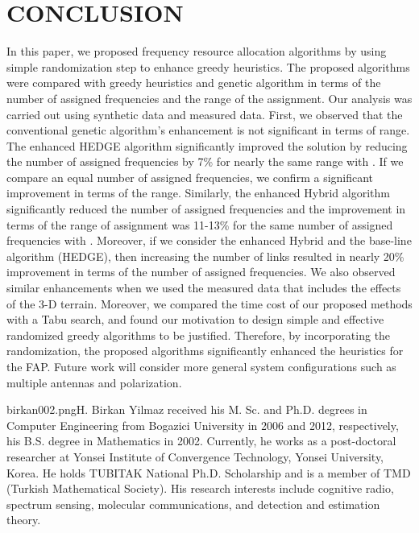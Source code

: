 \documentclass[10pt,twocolumn,twoside]{JCNtran}
\newcommand{\tbirkan}[1]{#1}
\begin{document}
\vspace{10pt}
\section{\uppercase{Conclusion}}
\label{sec:concl}
In this paper, we proposed frequency resource allocation algorithms by using \tbirkan{simple} randomization \tbirkan{step} to enhance greedy heuristics. The proposed algorithms were compared with greedy heuristics and genetic algorithm in terms of the number of assigned frequencies and the range of the assignment. Our analysis was carried out using synthetic data and measured data. First, we observed that the conventional genetic algorithm's enhancement is not significant in terms of range. The enhanced HEDGE algorithm significantly improved the solution by reducing the number of assigned frequencies by 7\% for nearly the same range with . If we compare an equal number of assigned frequencies, we confirm a significant improvement in terms of the range. Similarly, the enhanced Hybrid algorithm significantly reduced the number of assigned frequencies and the improvement in terms of the range of assignment was 11-13\% for the same number of assigned frequencies with . Moreover, if we consider the enhanced Hybrid and the base-line algorithm (HEDGE), then increasing the number of links resulted in nearly 20\% improvement in terms of the number of assigned frequencies. We also observed similar enhancements when we used the measured data that includes the effects of the 3-D terrain. \tbirkan{Moreover, we compared the time cost of our proposed methods with a Tabu search, and found our motivation to design simple and effective randomized greedy algorithms to be justified.} Therefore, by incorporating the randomization, the proposed algorithms significantly enhanced the heuristics for the FAP. Future work will consider more general system configurations such as multiple antennas and polarization. 








\epsfysize=3.2cm
\begin{biography}{birkan002.png}{H. Birkan Yilmaz}
received his M. Sc. and Ph.D. degrees in Computer Engineering from Bogazici University in 2006 and 2012, respectively, his B.S. degree in Mathematics in 2002. Currently, he works as a post-doctoral researcher at Yonsei Institute of Convergence Technology, Yonsei University, Korea. He holds TUBITAK National Ph.D. Scholarship and is a member of TMD (Turkish Mathematical Society). His research interests include cognitive radio, spectrum sensing, molecular communications, and detection and estimation theory.
\end{biography}
\end{document}
